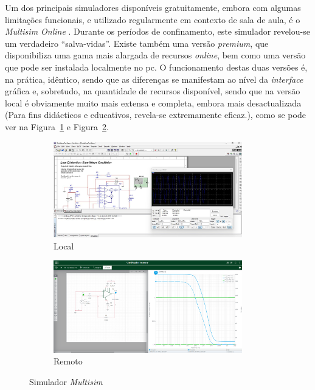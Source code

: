 Um dos principais simuladores disponíveis gratuitamente, embora com algumas limitações funcionais, e utilizado regularmente em contexto de sala de aula, é o \textit{Multisim Online} \cite{multisim}. Durante os períodos de confinamento, este simulador revelou-se um verdadeiro ``salva-vidas''. Existe também uma versão \textit{premium}, que disponibiliza uma gama mais alargada de recursos \textit{online}, bem como uma versão que pode ser instalada localmente no \acrshort{pc}. O funcionamento destas duas versões é, na prática, idêntico, sendo que as diferenças se manifestam ao nível da \textit{interface} gráfica e, sobretudo, na quantidade de recursos disponível, sendo que na versão local é obviamente muito mais extensa e completa, embora mais desactualizada (Para fins didácticos e educativos, revela-se extremamente eficaz.), como se pode ver na Figura~\ref{fig:multisimlocal} e Figura~\ref{fig:multisimremoto}.

\begin{figure}[hbtp]
    \centering
    \begin{subfigure}[hbtp]{0.48\textwidth}
        \centering
        \includegraphics[width=0.9\textwidth]{figures/Multisim_Desktop.png}
        \caption{Local}
        \label{fig:multisimlocal}
    \end{subfigure}
    \begin{subfigure}[hbtp]{0.48\textwidth}
        \includegraphics[width=0.9\textwidth]{figures/Multisim_ACsweep.png}
        \caption{Remoto}
        \label{fig:multisimremoto}
    \end{subfigure}
    \caption{Simulador \textit{Multisim}}
    \label{fig:multisimsimulator}
\end{figure}

